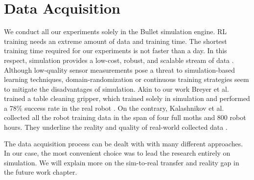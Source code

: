 \section{Data Acquisition}

We conduct all our experiments solely in the Bullet simulation engine. RL training needs an extreme amount of data and training time. The shortest training time required for our experiments is not faster than a day. In this respect, simulation provides a low-cost, robust, and scalable stream of data \cite{openai2019rubiks}. Although low-quality sensor measurements pose a threat to simulation-based learning techniques, domain-randomization or continuous training strategies seem to mitigate the disadvantages of simulation. Akin to our work Breyer et al. trained a table cleaning gripper, which trained solely in simulation and performed a \(78\%\) success rate in the real robot \cite{Breyer2018}. On the contrary, Kalashnikov et al. collected all the robot training data in the span of four full moths and 800 robot hours. They underline the reality and quality of real-world collected data \cite{Kalashnikov2018}. 

The data acquisition process can be dealt with with many different approaches. In our case, the most convenient choice was to lead the research entirely on simulation. We will explain more on the sim-to-real transfer and reality gap in the future work chapter.

